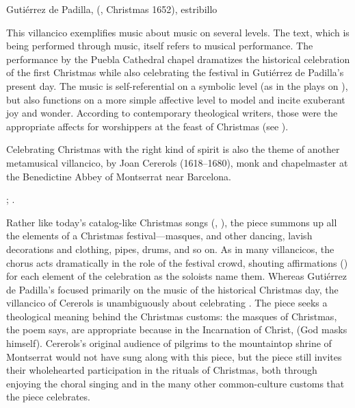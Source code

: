 
\begin{musicexample}
    \caption{Gutiérrez de Padilla, 
    (, Christmas 1652), estribillo}
    \label{mus:Padilla-Portalillo}
\end{musicexample}

This villancico exemplifies music about music on several levels.
The text, which is being performed through music, itself refers to musical
performance.
The performance by the Puebla Cathedral chapel dramatizes the historical
celebration of the first Christmas while also celebrating the festival in
Gutiérrez de Padilla's present day.  
The music is self-referential on a symbolic level (as in the plays on
), but also functions on a more simple affective level to model and
incite exuberant joy and wonder.
According to contemporary theological writers, those were the appropriate
affects for worshippers at the feast of Christmas (see
).


Celebrating Christmas with the right kind of spirit is also the theme of
another metamusical villancico,  by Joan
Cererols (1618--1680), monk and chapelmaster at the Benedictine Abbey of
Montserrat near Barcelona.%
\begin{Footnote}
    ; \autocite[81--94]{Cererols:MEM-VC}.
\end{Footnote}
Rather like today's catalog-like Christmas songs (,
), the piece summons up all the
elements of a Christmas festival---masques,  and other
dancing, lavish decorations and clothing, pipes, drums, and so on.
As in many villancicos, the chorus acts dramatically in the role of the
festival crowd, shouting affirmations () for each element of
the celebration as the soloists name them.  
Whereas Gutiérrez de Padilla's  focused
primarily on the music of the historical Christmas day, the villancico of
Cererols is unambiguously about celebrating .
The piece seeks a theological meaning behind the Christmas customs: the masques
of Christmas, the poem says, are appropriate because in the Incarnation of
Christ,  (God masks himself).
Cererols's original audience of pilgrims to the mountaintop shrine of
Montserrat would not have sung along with this piece, but the piece still
invites their wholehearted participation in the rituals of Christmas, both
through enjoying the choral singing and in the many other common-culture
customs that the piece celebrates.

